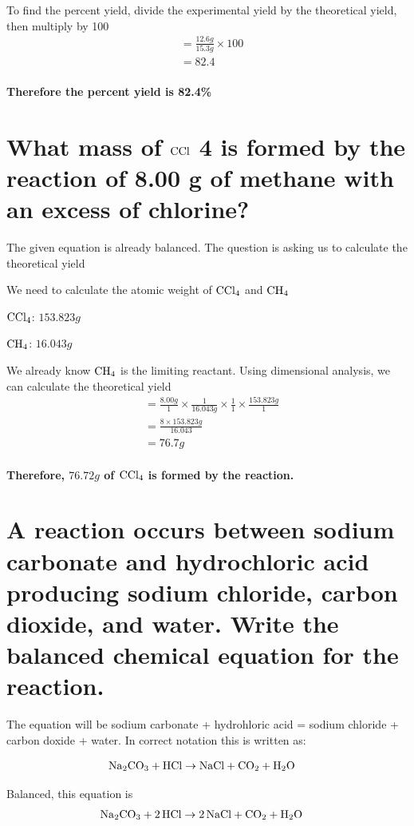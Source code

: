 \documentclass{scrartcl}
\begin{document}
To find the percent yield, divide the experimental yield by the theoretical
yield, then multiply by 100
\begin{align*}
  &=\frac{12.6g}{15.3g}\times100\\
  &=82.4\\
\end{align*}

\textbf{Therefore the percent yield is 82.4\%}

\section{What mass of \(\ce{CCl}\) 4 is formed by the reaction of 8.00 g of methane with an excess of chlorine?}
\label{sec:org1fdec8d}
The given equation is already balanced. The question is asking us to calculate
the theoretical yield

We need to calculate the atomic weight of \(\ce{CCl4}\) and \(\ce{CH4}\)

\(\ce{CCl4}\): \(153.823g\)

\(\ce{CH4}\): \(16.043g\)

We already know \(\ce{CH4}\) is the limiting reactant. Using dimensional analysis, we can calculate the theoretical yield
\begin{align*}
&=\frac{8.00g}{1}\times\frac{1}{16.043g}\times \frac{1}{1}\times \frac{153.823g}{1}\\
&=\frac{8 \times 153.823g}{16.043}\\
&=76.7g\\
\end{align*}

\textbf{Therefore, \(76.72g\) of \(\ce{CCl4}\) is formed by the reaction.}

\section{A reaction occurs between sodium carbonate and hydrochloric acid producing sodium chloride, carbon dioxide, and water. Write the balanced chemical equation for the reaction.}
\label{sec:orgfd6bfaa}
The equation will be sodium carbonate + hydrohloric acid = sodium chloride +
carbon doxide + water. In correct notation this is written as:

\begin{align*}
&\ce{Na2CO3 + HCl}\rightarrow\ce{NaCl + CO2 + H2O}
\end{align*}

Balanced, this equation is
\begin{align*}
&\ce{Na2CO3 + 2HCl}\rightarrow\ce{2NaCl + CO2 + H2O}
\end{align*}
\end{document}
